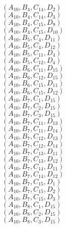 \documentclass[14pt]{article}
\begin{document}
    $({A}_{10}, {B}_{4}, {C}_{14}, {D}_{2}) $ \\ 
    $({A}_{10}, {B}_{4}, {C}_{14}, {D}_{3}) $ \\ 
    $({A}_{10}, {B}_{4}, {C}_{15}, {D}_{9}) $ \\ 
    $({A}_{10}, {B}_{4}, {C}_{15}, {D}_{10}) $ \\ 
    $({A}_{10}, {B}_{5}, {C}_{4}, {D}_{11}) $ \\ 
    $({A}_{10}, {B}_{5}, {C}_{4}, {D}_{12}) $ \\ 
    $({A}_{10}, {B}_{5}, {C}_{11}, {D}_{4}) $ \\ 
    $({A}_{10}, {B}_{5}, {C}_{12}, {D}_{4}) $ \\ 
    $({A}_{10}, {B}_{6}, {C}_{11}, {D}_{15}) $ \\ 
    $({A}_{10}, {B}_{6}, {C}_{12}, {D}_{15}) $ \\ 
    $({A}_{10}, {B}_{6}, {C}_{15}, {D}_{11}) $ \\ 
    $({A}_{10}, {B}_{6}, {C}_{15}, {D}_{12}) $ \\ 
    $({A}_{10}, {B}_{7}, {C}_{1}, {D}_{15}) $ \\ 
    $({A}_{10}, {B}_{7}, {C}_{2}, {D}_{15}) $ \\ 
    $({A}_{10}, {B}_{7}, {C}_{3}, {D}_{15}) $ \\ 
    $({A}_{10}, {B}_{7}, {C}_{11}, {D}_{13}) $ \\ 
    $({A}_{10}, {B}_{7}, {C}_{11}, {D}_{14}) $ \\ 
    $({A}_{10}, {B}_{7}, {C}_{12}, {D}_{13}) $ \\ 
    $({A}_{10}, {B}_{7}, {C}_{12}, {D}_{14}) $ \\ 
    $({A}_{10}, {B}_{7}, {C}_{13}, {D}_{11}) $ \\ 
    $({A}_{10}, {B}_{7}, {C}_{13}, {D}_{12}) $ \\ 
    $({A}_{10}, {B}_{7}, {C}_{14}, {D}_{11}) $ \\ 
    $({A}_{10}, {B}_{7}, {C}_{14}, {D}_{12}) $ \\ 
    $({A}_{10}, {B}_{7}, {C}_{15}, {D}_{1}) $ \\ 
    $({A}_{10}, {B}_{7}, {C}_{15}, {D}_{2}) $ \\ 
    $({A}_{10}, {B}_{7}, {C}_{15}, {D}_{3}) $ \\ 
    $({A}_{10}, {B}_{8}, {C}_{1}, {D}_{15}) $ \\ 
    $({A}_{10}, {B}_{8}, {C}_{2}, {D}_{15}) $ \\ 
    $({A}_{10}, {B}_{8}, {C}_{3}, {D}_{15}) $ \\ 
\end{document}
